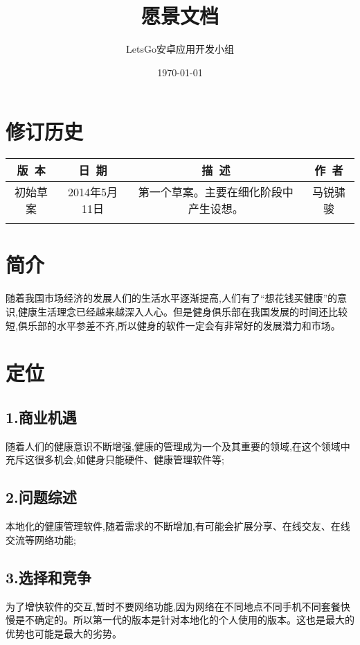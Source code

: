 \documentclass [a4paper,11pt]{article}
\title{愿景文档}
\date{\today}
\author{LetsGo安卓应用开发小组}
\begin{document}
	
\maketitle
\section*{修订历史}

\begin{table}[!hbp]
\centering

\begin{tabular*}{\textwidth}{c|c|c|c}
\hline
\rule{0pt}{0.8cm}
版~本 & 日~期 & 描~述 & 作~者\\
\hline
\rule{0pt}{0.6cm}
初始草案 & 2014年5月11日 & 第一个草案。主要在细化阶段中产生设想。 & 马锐骕骏\\
\hline
\rule{0pt}{0.6cm}
 &  &  & \\
\hline
\end{tabular*}

\end{table}

\section*{简介}
随着我国市场经济的发展人们的生活水平逐渐提高,人们有了“想花钱买健康”的意识,健康生活理念已经越来越深入人心。但是健身俱乐部在我国发展的时间还比较短,俱乐部的水平参差不齐,所以健身的软件一定会有非常好的发展潜力和市场。
\section*{定位}
\subsection*{1.商业机遇}
随着人们的健康意识不断增强,健康的管理成为一个及其重要的领域,在这个领域中充斥这很多机会,如健身只能硬件、健康管理软件等;
\subsection*{2.问题综述}
本地化的健康管理软件,随着需求的不断增加,有可能会扩展分享、在线交友、在线交流等网络功能;
\subsection*{3.选择和竞争}
为了增快软件的交互,暂时不要网络功能,因为网络在不同地点不同手机不同套餐快慢是不确定的。所以第一代的版本是针对本地化的个人使用的版本。这也是最大的优势也可能是最大的劣势。
\end{document}

